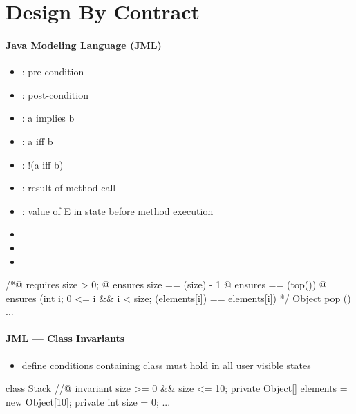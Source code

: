 \section{Design By Contract}

\paragraph{Java Modeling Language (JML)}
\begin{itemize}
  \item {}: pre-condition
  \item {}: post-condition
  \item {}: a implies b
  \item {}: a iff b
  \item {}: !(a iff b)
  \item \code{\\result}: result of method call
  \item {}: value of E in state before method execution
  \item {}
  \item {}
  \item {}
\end{itemize}
\begin{java}
  /*@ requires size > 0;
    @ ensures size == \old(size) - 1
    @ ensures \result == \old(top())
    @ ensures (\forall int i; 0 <= i && i < size;
                \old(elements[i]) == elements[i])
  */
  Object pop () { ... }
\end{java}

\paragraph{JML --- Class Invariants}
\begin{itemize}
  \item define conditions containing class must hold in all user visible states
\end{itemize}
\begin{java}
  class Stack {
    //@ invariant size >= 0 && size <= 10;
    private Object[] elements = new Object[10];
    private int size = 0;
    ...
  }
\end{java}

